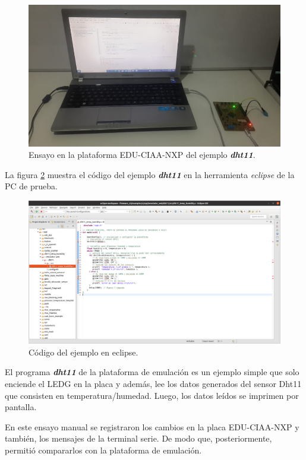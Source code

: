 \begin{figure}[ht]
	\centering
	\includegraphics[scale=.45]{./Figures/TestHardware.jpeg}
	\caption{Ensayo en la plataforma EDU-CIAA-NXP del ejemplo \textit{\textbf{dht11}}.}
	\label{fig:TestHardware}
\end{figure}



La figura \ref{fig:TestEclipse} muestra el código del ejemplo \textit{\textbf{dht11}} en la herramienta \textit{eclipse} de la PC de prueba.

\begin{figure}[ht]
	\centering
	\includegraphics[scale=.20]{./Figures/TestEclipse.png}
	\caption{Código del ejemplo en eclipse.}
	\label{fig:TestEclipse}
\end{figure}


El programa \textit{\textbf{dht11}} de la plataforma de emulación es un ejemplo simple que solo enciende el LEDG en la placa y además, lee los datos generados del sensor Dht11 que consisten en temperatura/humedad. Luego, los datos leídos se imprimen por pantalla. 

En este ensayo manual se registraron los cambios en la placa EDU-CIAA-NXP y también, los mensajes de la terminal serie. De modo que, posteriormente, permitió compararlos con la plataforma de emulación.

